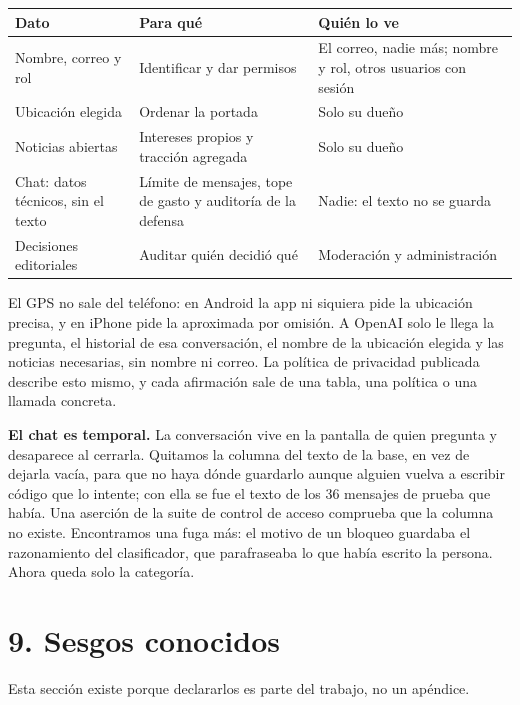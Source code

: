 \documentclass[12pt,a4paper]{article}
\begin{document}
\begin{center}
\renewcommand{\arraystretch}{1.35}
\begin{tabular}{|>{\raggedright\arraybackslash}p{3.4cm}|>{\raggedright\arraybackslash}p{5.6cm}|>{\raggedright\arraybackslash}p{4.6cm}|}
\hline
\textbf{Dato} & \textbf{Para qué} & \textbf{Quién lo ve} \\
\hline
Nombre, correo y rol & Identificar y dar permisos & El correo, nadie más; nombre y rol, otros
usuarios con sesión \\
\hline
Ubicación elegida & Ordenar la portada & Solo su dueño \\
\hline
Noticias abiertas & Intereses propios y tracción agregada & Solo su dueño \\
\hline
Chat: datos técnicos, sin el texto & Límite de mensajes, tope de gasto y auditoría de la defensa
& Nadie: el texto no se guarda \\
\hline
Decisiones editoriales & Auditar quién decidió qué & Moderación y administración \\
\hline
\end{tabular}
\end{center}

El GPS no sale del teléfono: en Android la app ni siquiera pide la ubicación precisa, y en iPhone
pide la aproximada por omisión. A OpenAI solo le llega la pregunta, el historial de esa
conversación, el nombre de la ubicación elegida y las noticias necesarias, sin nombre ni correo. La
política de privacidad publicada describe esto mismo, y cada afirmación sale de una tabla, una
política o una llamada concreta.

\textbf{El chat es temporal.} La conversación vive en la pantalla de quien pregunta y desaparece
al cerrarla. Quitamos la columna del texto de la base, en vez de dejarla vacía, para que no haya
dónde guardarlo aunque alguien vuelva a escribir código que lo intente; con ella se fue el texto de
los 36 mensajes de prueba que había. Una aserción de la suite de control de acceso comprueba que la
columna no existe. Encontramos una fuga más: el motivo de un bloqueo guardaba el razonamiento del
clasificador, que parafraseaba lo que había escrito la persona. Ahora queda solo la categoría.

\section{9. Sesgos conocidos}

Esta sección existe porque declararlos es parte del trabajo, no un apéndice.
\end{document}

